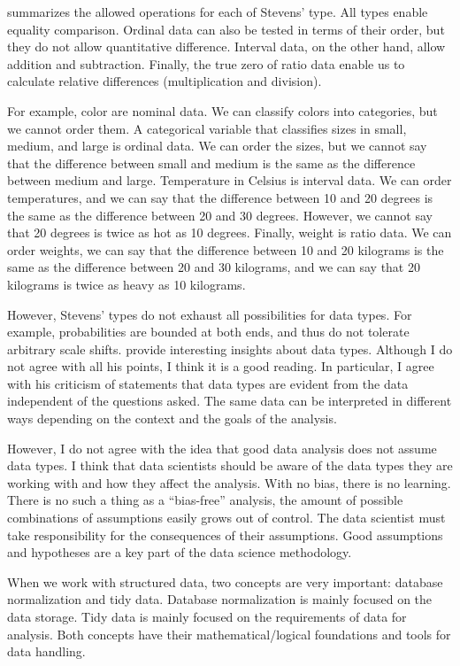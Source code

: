  summarizes the allowed operations for each of Stevens' type.  All types
enable equality comparison.  Ordinal data can also be tested in terms of their order, but
they do not allow quantitative difference.  Interval data, on the other hand, allow
addition and subtraction.  Finally, the true zero of ratio data enable us to calculate
relative differences (multiplication and division).

For example, color are nominal data.  We can classify colors into categories, but we cannot
order them.  A categorical variable that classifies sizes in small, medium, and large is
ordinal data.  We can order the sizes, but we cannot say that the difference between small
and medium is the same as the difference between medium and large.  Temperature in Celsius
is interval data.  We can order temperatures, and we can say that the difference between
10 and 20 degrees is the same as the difference between 20 and 30 degrees.  However, we
cannot say that 20 degrees is twice as hot as 10 degrees.  Finally, weight is ratio data.
We can order weights, we can say that the difference between 10 and 20 kilograms is the
same as the difference between 20 and 30 kilograms, and we can say that 20 kilograms is
twice as heavy as 10 kilograms.

However, Stevens' types do not exhaust all possibilities for data types.  For example,
probabilities are bounded at both ends, and thus do not tolerate arbitrary scale shifts.
\textcite{Paul1993} provide interesting insights about data types.  Although I do not
agree with all his points, I think it is a good reading.  In particular, I agree with
his criticism of statements that data types are evident from the data independent of the
questions asked.  The same data can be interpreted in different ways depending on the
context and the goals of the analysis.

However, I do not agree with the idea that good data analysis does not assume data types.
I think that data scientists should be aware of the data types they are working with and
how they affect the analysis.  With no bias, there is no learning.  There is no such a
thing as a ``bias-free'' analysis, the amount of possible combinations of assumptions
easily grows out of control.  The data scientist must take responsibility for the
consequences of their assumptions.  Good assumptions and hypotheses are a key part of the
data science methodology.

When we work with structured data, two concepts are very important: database normalization
and tidy data.  Database normalization is mainly focused on the data storage.  Tidy data is
mainly focused on the requirements of data for analysis.  Both concepts have their
mathematical/logical foundations and tools for data handling.

